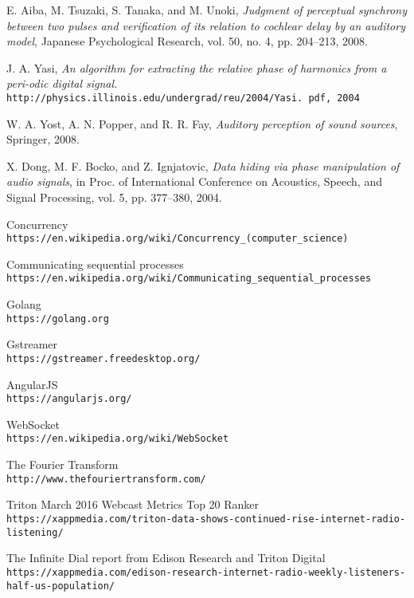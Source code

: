 \documentclass[a4paper, 13pt, oneside]{Thesis}  %
\begin{document}
\begin{thebibliography}{9}
E. Aiba, M. Tsuzaki, S. Tanaka, and M. Unoki, \textit{Judgment of perceptual synchrony
between two pulses and verification of its relation to cochlear delay by an auditory
model}, Japanese Psychological Research, vol. 50, no. 4, pp. 204–213, 2008.

J. A. Yasi, \textit{An algorithm for extracting the relative phase of harmonics from a peri-odic digital signal.}
\\\texttt{http://physics.illinois.edu/undergrad/reu/2004/Yasi.
pdf, 2004}

W. A. Yost, A. N. Popper, and R. R. Fay, \textit{Auditory perception of sound sources}, Springer, 2008.

X. Dong, M. F. Bocko, and Z. Ignjatovic, \textit{Data hiding via phase manipulation
of audio signals}, in Proc. of International Conference on Acoustics, Speech, and
Signal Processing, vol. 5, pp. 377–380, 2004.

Concurrency
\\\texttt{https://en.wikipedia.org/wiki/Concurrency\_{}(computer\_{}science)}

Communicating sequential processes
\\\texttt{https://en.wikipedia.org/wiki/Communicating\_{}sequential\_{}processes}

Golang
\\\texttt{https://golang.org}

Gstreamer
\\\texttt{https://gstreamer.freedesktop.org/}

AngularJS
\\\texttt{https://angularjs.org/}

WebSocket
\\\texttt{https://en.wikipedia.org/wiki/WebSocket}

The Fourier Transform
\\\texttt{http://www.thefouriertransform.com/}

Triton March 2016 Webcast Metrics Top 20 Ranker
\\\texttt{https://xappmedia.com/triton-data-shows-continued-rise-internet-radio-listening/}

The Infinite Dial report from Edison Research and Triton Digital
\\\texttt{https://xappmedia.com/edison-research-internet-radio-weekly-listeners-half-us-population/}


\end{thebibliography}
\end{document}
